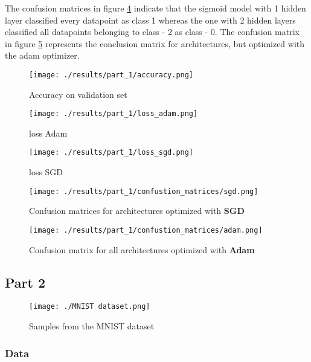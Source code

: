 The confusion matrices in figure \ref*{fig: cm SGD} indicate that the sigmoid model with
1 hidden layer classified every datapoint as class 1 whereas the one with 2 hidden 
layers classified all datapoints belonging to class - 2 as class - 0. The confusion matrix in
figure \ref*{fig: cm adam} represents the conclusion matrix for architectures, but 
optimized with the adam optimizer.


\begin{figure}
    \centering
    \texttt{[image: ./results/part\_1/accuracy.png]}
    \caption{Accuracy on validation set}
    \label{fig: Accuracy}
\end{figure}

\begin{figure}
    \centering
    \texttt{[image: ./results/part\_1/loss\_adam.png]}
    \caption{loss Adam}
    \label{fig: loss curves-Adam}
\end{figure}

\begin{figure}
    \centering
    \texttt{[image: ./results/part\_1/loss\_sgd.png]}
    \caption{loss SGD}
    \label{fig: loss curves-SGD}
\end{figure}

\begin{figure}
    \centering
    \texttt{[image: ./results/part\_1/confustion\_matrices/sgd.png]}
    \caption{Confusion matrices for architectures optimized with \textbf{SGD}}
    \label{fig: cm SGD}
\end{figure}

\begin{figure}[t]
    \centering
    \texttt{[image: ./results/part\_1/confustion\_matrices/adam.png]}
    \caption{Confusion matrix for all architectures optimized with \textbf{Adam}}
    \label{fig: cm adam}
\end{figure}


\subsection{Part 2}

\begin{figure}[h]
    \centering
    \texttt{[image: ./MNIST dataset.png]}
    \caption{Samples from the MNIST dataset}
    \label{fig: mnsit}
\end{figure}

\subsubsection{Data}

